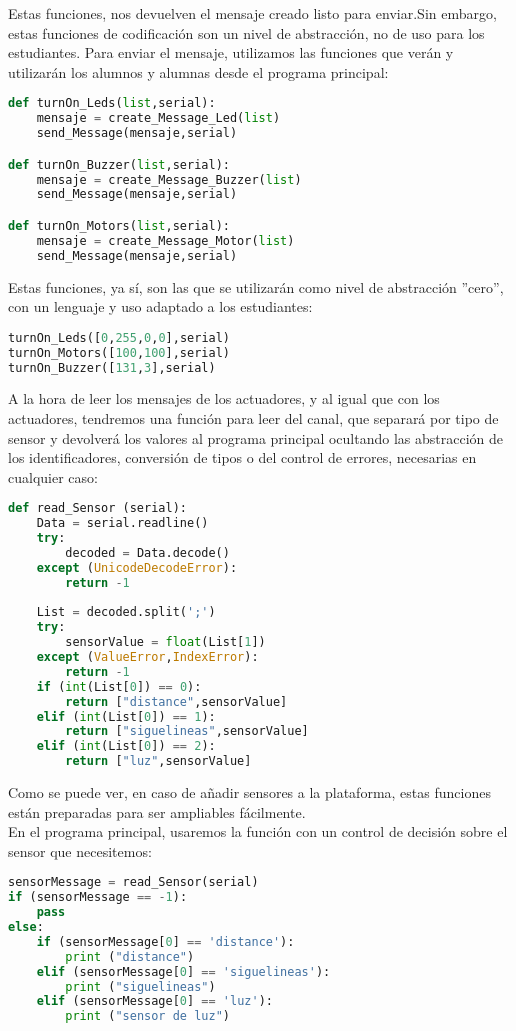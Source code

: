 Estas funciones, nos devuelven el mensaje creado listo para enviar.Sin embargo, estas funciones de codificación son un nivel de abstracción, no de uso para los estudiantes. Para enviar el mensaje, utilizamos las funciones que verán y utilizarán los alumnos y alumnas desde el programa principal:
\begin{lstlisting}[language=python,caption={Funciones en la biblioteca PC para el envío de mensajes a los actuadores},captionpos=b]
def turnOn_Leds(list,serial):
	mensaje = create_Message_Led(list)
	send_Message(mensaje,serial)

def turnOn_Buzzer(list,serial):
	mensaje = create_Message_Buzzer(list)
	send_Message(mensaje,serial)

def turnOn_Motors(list,serial):
	mensaje = create_Message_Motor(list)
	send_Message(mensaje,serial)
\end{lstlisting}

Estas funciones, ya sí, son las que se utilizarán como nivel de abstracción ''cero'', con un lenguaje y uso adaptado a los estudiantes:
\begin{lstlisting}[language=python,caption={Uso de los actuadores desde el Programa Principal},captionpos=b]
turnOn_Leds([0,255,0,0],serial)
turnOn_Motors([100,100],serial)
turnOn_Buzzer([131,3],serial)
\end{lstlisting}

A la hora de leer los mensajes de los actuadores, y al igual que con los actuadores, tendremos una función para leer del canal, que separará por tipo de sensor y devolverá los valores al programa principal ocultando las abstracción de los identificadores, conversión de tipos o del control de errores, necesarias en cualquier caso:
\begin{lstlisting}[language=python,caption={Lectura de los sensores en la biblioteca PC},captionpos=b]
def read_Sensor (serial):
	Data = serial.readline()
	try:
		decoded = Data.decode()
	except (UnicodeDecodeError):
		return -1 
	
	List = decoded.split(';')
	try:
		sensorValue = float(List[1])
	except (ValueError,IndexError):
		return -1 
	if (int(List[0]) == 0):
		return ["distance",sensorValue]
	elif (int(List[0]) == 1):
		return ["siguelineas",sensorValue]
	elif (int(List[0]) == 2):
		return ["luz",sensorValue]
\end{lstlisting}
Como se puede ver, en caso de añadir sensores a la plataforma, estas funciones están preparadas para ser ampliables fácilmente.\\
En el programa principal, usaremos la función con un control de decisión sobre el sensor que necesitemos:
\begin{lstlisting}[language=python,caption={Lectura de sensores en el Programa Principal},captionpos=b]
sensorMessage = read_Sensor(serial)
if (sensorMessage == -1):
	pass
else:
	if (sensorMessage[0] == 'distance'):
		print ("distance")
	elif (sensorMessage[0] == 'siguelineas'):
		print ("siguelineas")
	elif (sensorMessage[0] == 'luz'):
		print ("sensor de luz")
		
\end{lstlisting}

